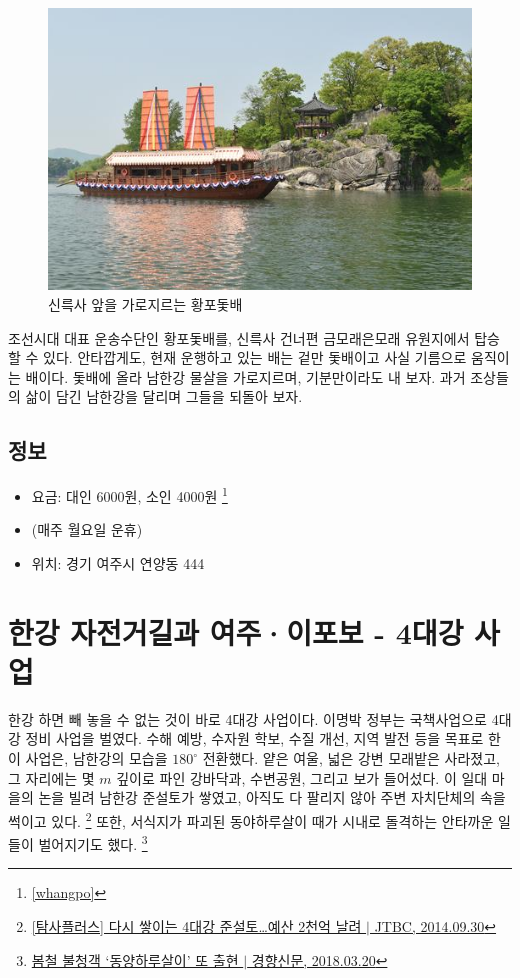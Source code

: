\begin{figure}[ht]
    \centering
    \includegraphics[width=.6\textwidth]{img/황포돛배.jpg}
    \caption{신륵사 앞을 가로지르는 황포돛배\protect\footnotemark}
    \label{fig:my_labe6}
\end{figure}


조선시대 대표 운송수단인 황포돛배를, 신륵사 건너편 금모래은모래 유원지에서 탑승할 수 있다. 
안타깝게도, 현재 운행하고 있는 배는 겉만 돛배이고 사실 기름으로 움직이는 배이다.
돛배에 올라 남한강 물살을 가로지르며, 기분만이라도 내 보자.
과거 조상들의 삶이 담긴 남한강을 달리며 그들을 되돌아 보자.

\subsection{정보}
\begin{itemize}
    \item 요금: 대인 6000원, 소인 4000원 \footnote{\ref{whangpo}}
    \item (매주 월요일 운휴)
    \item 위치: 경기 여주시 연양동 444
\end{itemize}

\section{한강 자전거길과 여주·이포보 - 4대강 사업}

한강 하면 빼 놓을 수 없는 것이 바로 4대강 사업이다.
이명박 정부는 국책사업으로 4대강 정비 사업을 벌였다.
수해 예방, 수자원 학보, 수질 개선, 지역 발전 등을 목표로 한 이 사업은,
남한강의 모습을 $180^\circ$ 전환했다.
얕은 여울, 넓은 강변 모래밭은 사라졌고, 그 자리에는 몇 $m$ 깊이로 파인 강바닥과, 수변공원, 그리고 보가 들어섰다.
이 일대 마을의 논을 빌려 남한강 준설토가 쌓였고,
아직도 다 팔리지 않아 주변 자치단체의 속을 썩이고 있다.
\footnote{\href{https://news.jtbc.joins.com/article/article.aspx?news_id=NB10593178}{[탐사플러스] 다시 쌓이는 4대강 준설토…예산 2천억 날려 $|$ JTBC, 2014.09.30}}
또한, 서식지가 파괴된 동야하루살이 때가 시내로 돌격하는 안타까운 일들이 벌어지기도 했다.
\footnote{\href{http://news.khan.co.kr/kh_news/khan_art_view.html?artid=201803201448001&code=620109}{봄철 불청객 `동양하루살이' 또 출현 $|$ 경향신문, 2018.03.20}}

